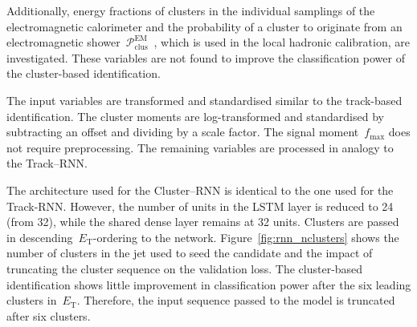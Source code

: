 Additionally, energy fractions of clusters in the individual samplings of the
electromagnetic calorimeter and the probability of a cluster to originate from
an electromagnetic
shower~$\mathcal{P}_\text{clus}^\text{EM}$~\cite{atlas_topoclustering}, which is
used in the local hadronic calibration, are investigated. These variables are
not found to improve the classification power of the cluster-based
identification.

The input variables are transformed and standardised similar to the track-based
identification. The cluster moments are log-transformed and standardised by
subtracting an offset and dividing by a scale factor. The signal
moment~$f_\text{max}$ does not require preprocessing. The remaining variables
are processed in analogy to the Track--RNN.

The architecture used for the Cluster--RNN is identical to the one used for the
Track-RNN. However, the number of units in the LSTM layer is reduced to 24 (from
32), while the shared dense layer remains at 32 units. Clusters are passed in
descending~$E_\text{T}$-ordering to the network. Figure~\ref{fig:rnn_nclusters}
shows the number of clusters in the jet used to seed the \tauhadvis candidate
and the impact of truncating the cluster sequence on the validation loss. The
cluster-based identification shows little improvement in classification power
after the six leading clusters in~$E_\text{T}$. Therefore, the input sequence
passed to the model is truncated after six clusters.

